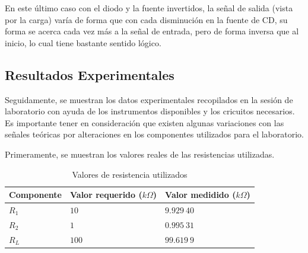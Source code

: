 \documentclass[journal]{IEEEtran}
\begin{document}
En este último caso con el diodo y la fuente invertidos, la señal de salida (vista por la carga) varía de forma que con cada disminución en la fuente de CD, su forma 
se acerca cada vez más a la señal de entrada, pero de forma inversa que al inicio, lo cual tiene bastante sentido lógico. 

\subsection{Resultados Experimentales}

Seguidamente, se muestran los datos experimentales recopilados en la sesión de laboratorio con ayuda de los instrumentos disponibles y los cricuitos necesarios.
Es importante tener en consideración que existen algunas variaciones con las señales teóricas por alteraciones en los componentes utilizados para el laboratorio.

Primeramente, se muestran los valores reales de las resistencias utilizadas. 

\begin{table}[H]
        \centering
        \renewcommand{\arraystretch}{1.5}
        \caption{Valores de resistencia utilizados}
        \begin{tabular}{|>{\centering\arraybackslash}m{2cm}|>{\centering\arraybackslash}m{2cm}|>{\centering\arraybackslash}m{2cm}|}
             \hline
             Componente & Valor requerido ($k\Omega$) & Valor medidido ($k\Omega$) \\ 
             \hline
             $R_1$ & $10$& $9.929~40$ \\ 
             \hline
             $R_2$ & $1$ & $0.995~31$\\
             \hline
             $R_L$ & $100$ & $99.619~9$\\
             \hline
            \end{tabular}
    	\label{tabla1}   
	\end{table}
\vspace{5mm}
\end{document}
